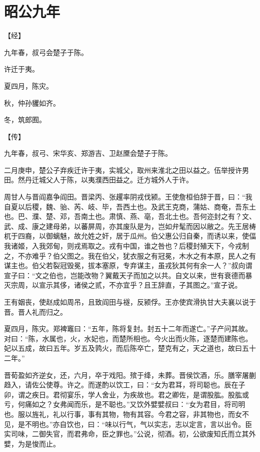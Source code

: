 \documentclass[a4paper,12pt,UTF8,twoside]{ctexbook}
\begin{document}
\chapter{昭公九年}



【经】

九年春，叔弓会楚子于陈。

许迁于夷。

夏四月，陈灾。

秋，仲孙貜如齐。

冬，筑郎囿。

【传】

九年春，叔弓、宋华亥、郑游吉、卫赵黡会楚子于陈。

二月庚申，楚公子弃疾迁许于夷，实城父，取州来淮北之田以益之。伍举授许男田。然丹迁城父人于陈，以夷濮西田益之。迁方城外人于许。

周甘人与晋阎嘉争阎田。晋梁丙、张趯率阴戎伐颍。王使詹桓伯辞于晋，曰：“我自夏以后稷，魏、骀、芮、岐、毕，吾西土也。及武王克商，蒲姑、商奄，吾东土也。巴、濮、楚、邓，吾南土也。肃慎、燕、亳，吾北土也。吾何迩封之有？文、武、成、康之建母弟，以蕃屏周，亦其废队是为，岂如弁髦而因以敝之。先王居梼杌于四裔，以御螭魅，故允姓之奸，居于瓜州。伯父惠公归自秦，而诱以来，使偪我诸姬，入我郊甸，则戎焉取之。戎有中国，谁之咎也？后稷封殖天下，今戎制之，不亦难乎？伯父图之。我在伯父，犹衣服之有冠冕，木水之有本原，民人之有谋主也。伯父若裂冠毁冕，拔本塞原，专弃谋主，虽戎狄其何有余一人？”叔向谓宣子曰：“文之伯也，岂能改物？翼戴天子而加之以共。自文以来，世有衰德而暴灭宗周，以宣示其侈，诸侯之贰，不亦宜乎？且王辞直，子其图之。”宣子说。

王有姻丧，使赵成如周吊，且致阎田与襚，反颍俘。王亦使宾滑执甘大夫襄以说于晋。晋人礼而归之。

夏四月，陈灾。郑裨竈曰：“五年，陈将复封。封五十二年而遂亡。”子产问其故。对曰：“陈，水属也，火，水妃也，而楚所相也。今火出而火陈，逐楚而建陈也。妃以五成，故曰五年。岁五及鹑火，而后陈卒亡，楚克有之，天之道也，故曰五十二年。”

晋荀盈如齐逆女，还，六月，卒于戏阳。殡于绛，未葬。晋侯饮酒，乐。膳宰屠蒯趋入，请佐公使尊。许之。而遂酌以饮工，曰：“女为君耳，将司聪也。辰在子卯，谓之疾日。君彻宴乐，学人舍业，为疾故也。君之卿佐，是谓股肱。股肱或亏，何痛如之？女弗闻而乐，是不聪也。”又饮外嬖嬖叔曰：“女为君目，将司明也。服以旌礼，礼以行事，事有其物，物有其容。今君之容，非其物也，而女不见，是不明也。”亦自饮也，曰：“味以行气，气以实志，志以定言，言以出令。臣实司味，二御失官，而君弗命，臣之罪也。”公说，彻酒。初，公欲废知氏而立其外嬖，为是悛而止。
\end{document}
